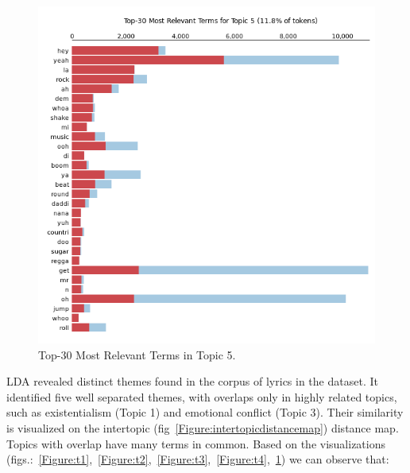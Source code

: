 \begin{center}
\begin{figure}[H]
  \centering
  \includegraphics[width=6in]{img/topics/png/t5.png}
  \caption{Top-30 Most Relevant Terms in Topic 5.}
  \label{Figure:t5}
\end{figure}
\end{center}

LDA revealed distinct themes found in the corpus of  lyrics in the dataset. It
identified five well separated themes, with overlaps only in highly related
topics, such as existentialism (Topic 1) and emotional conflict (Topic 3).
Their similarity is visualized on the intertopic
(fig~\ref{Figure:intertopicdistancemap}) distance map. Topics with overlap have
many terms in common. Based on the visualizations
(figs.:~\ref{Figure:t1},~\ref{Figure:t2},~\ref{Figure:t3},~\ref{Figure:t4},~\ref{Figure:t5})
we can observe that:

